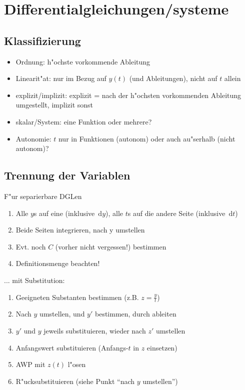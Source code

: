 \documentclass[fleqn,12pt]{scrartcl}
\newcommand{\id}{\, \mathrm{d}}
\begin{document}
\section{Differentialgleichungen/systeme}
\subsection{Klassifizierung}
\begin{itemize}
	\item
		Ordnung: h"ochste vorkommende Ableitung
	\item
		Linearit"at: nur im Bezug auf $y(t)$ (und Ableitungen), nicht auf $t$ allein
	\item
		explizit/implizit: explizit = nach der h"ochsten vorkommenden Ableitung umgestellt, implizit sonst
	\item
		skalar/System: eine Funktion oder mehrere?
	\item
		Autonomie: $t$ nur in Funktionen (autonom) oder auch au"serhalb (nicht autonom)?
\end{itemize}
\subsection{Trennung der Variablen}
F"ur separierbare DGLen
\begin{enumerate}
	\item 
		Alle $y$s auf eine (inklusive $\id y$), alle $t$s auf die andere Seite (inklusive $\id t$)
	\item
		Beide Seiten integrieren, nach y umstellen
	\item
		Evt. noch $C$ (vorher nicht vergessen!) bestimmen 
	\item
		Definitionsmenge beachten!
\end{enumerate}
... mit Substitution:
\begin{enumerate}
	\item
		Geeigneten Substanten bestimmen (z.B. $z = \frac{y}{t}$)
	\item
		Nach $y$ umstellen, und $y'$ bestimmen, durch ableiten
	\item
		$y'$ und $y$ jeweils substituieren, wieder nach $z'$ umstellen
	\item
		Anfangswert substituieren (Anfangs-$t$ in $z$ einsetzen)
	\item
		AWP mit $z(t)$ l"osen
	\item
		R"ucksubstituieren (siehe Punkt \enquote{nach $y$ umstellen})
\end{enumerate}
\end{document}
